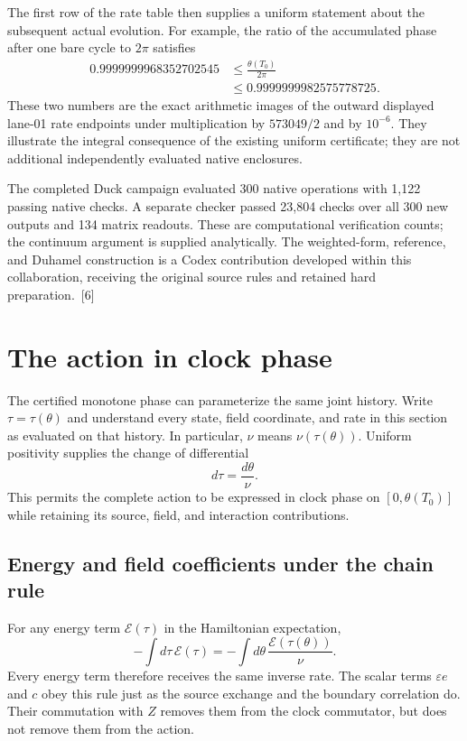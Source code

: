 \documentclass[10pt,twocolumn,letterpaper]{article}
\begin{document}
The first row of the rate table then supplies a uniform statement about the subsequent actual evolution. For example, the ratio of the accumulated phase after one bare cycle to $2\pi$ satisfies
\[
\begin{aligned}
0.9999999968352702545
&\le\frac{\theta(T_0)}{2\pi}\\
&\le0.9999999982575778725.
\end{aligned}
\]
These two numbers are the exact arithmetic images of the outward displayed lane-01 rate endpoints under multiplication by $573049/2$ and by $10^{-6}$. They illustrate the integral consequence of the existing uniform certificate; they are not additional independently evaluated native enclosures.

The completed Duck campaign evaluated 300 native operations with 1,122 passing native checks. A separate checker passed 23,804 checks over all 300 new outputs and 134 matrix readouts. These are computational verification counts; the continuum argument is supplied analytically. The weighted-form, reference, and Duhamel construction is a Codex contribution developed within this collaboration, receiving the original source rules and retained hard preparation.~[6]

\section{The action in clock phase}
The certified monotone phase can parameterize the same joint history. Write $\tau=\tau(\theta)$ and understand every state, field coordinate, and rate in this section as evaluated on that history. In particular, $\nu$ means $\nu(\tau(\theta))$. Uniform positivity supplies the change of differential
\[
d\tau=\frac{d\theta}{\nu}.
\]
This permits the complete action to be expressed in clock phase on $[0,\theta(T_0)]$ while retaining its source, field, and interaction contributions.

\subsection{Energy and field coefficients under the chain rule}
For any energy term $\mathcal E(\tau)$ in the Hamiltonian expectation,
\[
-\int d\tau\,\mathcal E(\tau)
=-\int d\theta\,\frac{\mathcal E(\tau(\theta))}{\nu}.
\]
Every energy term therefore receives the same inverse rate. The scalar terms $\varepsilon e$ and $c$ obey this rule just as the source exchange and the boundary correlation do. Their commutation with $Z$ removes them from the clock commutator, but does not remove them from the action.
\end{document}

